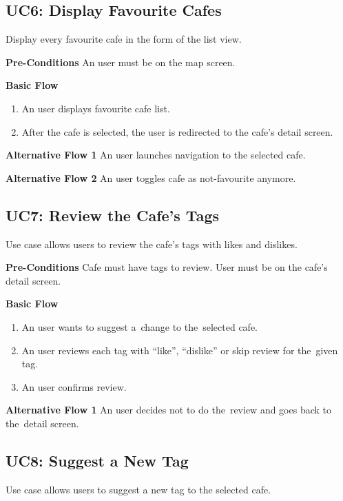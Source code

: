 
\subsection{UC6: Display Favourite Cafes}
Display every favourite cafe in the form of the list view. 

\newpara
\noindent \textbf{Pre-Conditions} An user must be on the map screen.

\newpara
\noindent \textbf{Basic Flow}

\begin{enumerate}
    \item An user displays favourite cafe list.
    \item After the cafe is selected, the user is redirected to the cafe's detail screen.
\end{enumerate}

\textbf{Alternative Flow 1} An user launches navigation to the selected cafe.

\textbf{Alternative Flow 2} An user toggles cafe as not-favourite anymore.


\subsection{UC7: Review the Cafe's Tags}
Use case allows users to review the cafe's tags with likes and dislikes. 

\newpara
\noindent \textbf{Pre-Conditions} Cafe must have tags to review. User must be on the cafe's detail screen.

\newpara
\noindent \textbf{Basic Flow}

\begin{enumerate}
    \item An user wants to suggest a~change to the~selected cafe.
    \item An user reviews each tag with ``like'', ``dislike'' or skip review for the~given tag. 
    \item An user confirms review.
\end{enumerate}

\noindent \textbf{Alternative Flow 1} An user decides not to do the~review and goes back to the~detail screen.


\subsection{UC8: Suggest a New Tag}
Use case allows users to suggest a new tag to the selected cafe.

